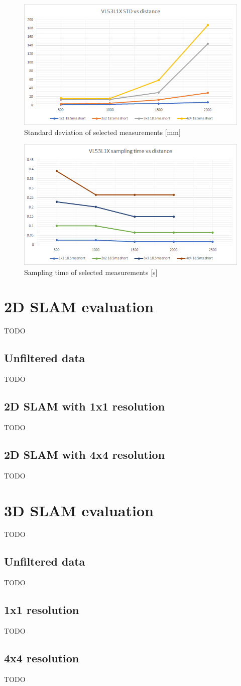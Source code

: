 \begin{figure}[!h]
    \centering
	\includegraphics[width=115mm, keepaspectratio]{figures/vl53l1x_measurements_03_std.png}
    \caption{Standard deviation of selected measurements [mm]}
    \label{fig:vl53l1x_meas_detailed_std}
\end{figure}


\begin{figure}[!h]
    \centering
	\includegraphics[width=115mm, keepaspectratio]{figures/vl53l1x_measurements_03_ts.png}
    \caption{Sampling time of selected measurements [s]}
    \label{fig:vl53l1x_meas_detailed_ts}
\end{figure}

\newpage

\section{2D SLAM evaluation}
TODO
\subsection{Unfiltered data}
TODO
\subsection{2D SLAM with 1x1 resolution}
TODO
\subsection{2D SLAM with 4x4 resolution}
TODO

\section{3D SLAM evaluation}
TODO
\subsection{Unfiltered data}
TODO
\subsection{1x1 resolution}
TODO
\subsection{4x4 resolution}
TODO